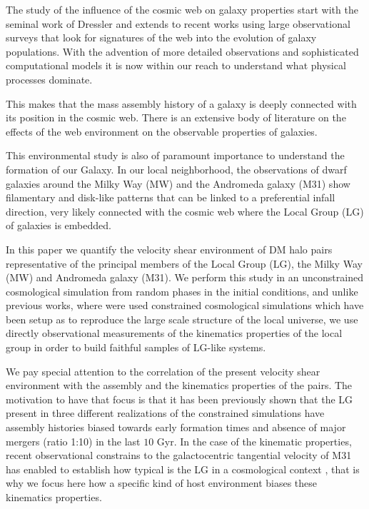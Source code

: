 \documentclass[usenatbib]{latex/mn2e}
\begin{document}
The study of the influence of the cosmic web on galaxy properties start 
with the seminal work of Dressler  and extends to 
recent works using large observational surveys that look for signatures of 
the web into the evolution of galaxy populations. With the advention of 
more detailed observations and sophisticated computational models it is 
now within our reach to understand what physical processes dominate.



This makes  that the mass assembly history of a galaxy is deeply connected 
with its  position in the cosmic web. There is an extensive body of 
literature on the effects of the web environment on the observable 
properties of galaxies. 



This environmental study is also of paramount importance to understand the 
formation of our Galaxy. In our local neighborhood, the observations of 
dwarf galaxies around the Milky Way (MW) and the Andromeda galaxy (M31) 
show filamentary and disk-like patterns that can be linked to a 
preferential infall direction, very likely connected with the cosmic web 
where the Local Group (LG) of galaxies is embedded. 



In this paper we quantify the velocity shear environment of DM halo pairs
representative of the principal members of the Local Group (LG), the Milky
Way (MW) and Andromeda galaxy (M31). We perform this study in an 
unconstrained cosmological simulation from random phases in the initial 
conditions, and unlike previous works, where were used constrained 
cosmological simulations which have been setup as to reproduce the large 
scale structure of the local universe, we use directly observational 
measurements of the kinematics properties of the local group  in order to build faithful samples of LG-like systems.



We pay special attention to the correlation of the present velocity shear 
environment with the assembly and the kinematics properties of the pairs. 
The motivation to have that focus is that it has been previously shown 
that the LG present in three different realizations of the constrained 
simulations have assembly histories biased towards early formation times 
and absence of major mergers (ratio 1:10) in the last $10$ Gyr. In the 
case of the kinematic properties, recent observational constrains to the 
galactocentric tangential velocity of M31 has enabled to establish how 
typical is the LG in a cosmological context , that is why we focus here how a specific kind of 
host environment biases these kinematics properties.
\end{document}
